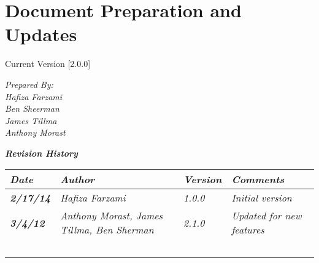 
\chapter{Document Preparation and Updates}

Current Version [2.0.0]
\vspace*{5mm}

{\color{MSBlue3}
\noindent
\textit{Prepared By:}\\
\textit{Hafiza Farzami}\\
\textit{Ben Sheerman}\\
\textit{James Tillma}\\
\textit{Anthony Morast}\\
}

\vfill
\noindent
{\color{color02} \textit{\textbf{Revision History}}}\\
\begin{tabular}{|>{\raggedright}p{1.5cm}|>{\raggedright}p{3cm}|>{\raggedright}p{1.5cm}|>{\raggedright}p{9cm}|}
\hline
\textit{\textbf{Date}} &  \textit{\textbf{Author}} & \textit{\textbf{Version}} & \textit{\textbf{Comments}}\tabularnewline
\hline
 \textit{\textbf{2/17/14}} & \textit{Hafiza Farzami} & \textit{1.0.0} & \textit{Initial version}\tabularnewline
\hline
\textit{\textbf{3/4/12}} & \textit{Anthony Morast, James Tillma, Ben Sherman} & \textit{2.1.0} & \textit{Updated for new features}\tabularnewline
\hline
 &  &  & \tabularnewline
 \hline
 &  &  & \tabularnewline
\hline
 &  &  & \tabularnewline
\hline
 &  &  & \tabularnewline
\hline
 &  &  & \tabularnewline
\hline
\end{tabular}
\vfill

